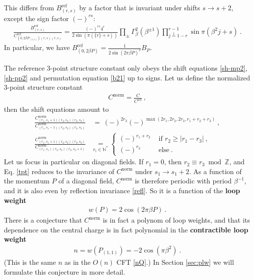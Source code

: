 \documentclass[12pt, a4paper]{article}
\newcommand{\myindex}[1]{\textbf{\boldmath #1}}
\theoremstyle{break}
\begin{document}
This differs from $B^\text{ref}_{(r,s)}$ by a factor that is invariant under shifts $s\to s+2$, except the sign factor $(-)^{rs}$:
 \begin{align}
  \frac{B^\text{ref}_{(r,s)}}{C^\text{ref}_{(0,2\beta P_{(1,1)})(r,s)(r,s)}} = 
  \frac{(-)^{rs} 4^r}{2\sin\left(\pi(\{r\}+s)\right)}
  \prod_\pm \Gamma_\beta^{2}(\beta^{\pm 1})
  \prod_{j\overset{1}{=}1-r}^{r-1} \sin\pi(\beta^2j+s) \ .
 \end{align}
In particular, we have $B^\text{ref}_{(0,2\beta P)} = \frac{1}{2\sin(2\pi\beta P)^2}B_P$.

The reference 3-point structure constant only obeys the shift equations \eqref{sh-mp2}, \eqref{sh-pp2} and permutation equation \eqref{b21} up to signs. Let us define the normalized 3-point structure constant 
\begin{align}
 C^\text{norm} = \frac{C}{C^\text{ref}}\ , 
\end{align}
then the shift equations amount to \cite{nrj23}
\begin{align}
 \frac{C^\text{norm}_{(r_1,s_1+1)(r_2,s_2)(r_3,s_3)}}{C^\text{norm}_{(r_1,s_1-1)(r_2,s_2)(r_3,s_3)}} &\ =\  (-)^{2r_3}(-)^{\max(2r_1, 2r_2, 2r_3,r_1+r_2+r_3)} \ ,
 \label{tpt}
 \\
 \frac{C^\text{norm}_{(r_1,s_1+1)(r_2,s_2)(r_3,s_3)}}{C^\text{norm}_{(r_1,s_1)(r_2,s_2)(r_3,s_3+1)}} &\underset{r_i\in\mathbb{N}^*}{=} 
 \left\{\begin{array}{ll} (-)^{r_1+r_2} &\text{ if } r_2\geq |r_1-r_3|\ ,
                        \\ (-)^{r_3} &\text{ else}\ .
                       \end{array}\right. 
\label{tppt}
\end{align}
Let us focus in particular on diagonal fields. If $r_1=0$, then $r_2\equiv r_3\bmod\mathbb{Z}$, and Eq. \eqref{tpt} reduces to the invariance of $C^\text{norm}$ under $s_1\to s_1+2$. As a function of the momentum $P$ of a diagonal field, $C^\text{norm}$ is therefore periodic with period $\beta^{-1}$, and it is also even by reflection invariance \eqref{refl}. So it is a function of the \myindex{loop weight}
\begin{align}
 \boxed{w(P) = 2\cos(2\pi\beta P)}\ .
 \label{wP}
\end{align}
There is a conjecture that $C^\text{norm}$ is in fact a polynom of loop weights, and that its dependence on the central charge is in fact polynomial in the \myindex{contractible loop weight}
\begin{align}
 \boxed{n= w\left(P_{(1,1)}\right) = -2\cos(\pi \beta^2)} \ .
 \label{ncb}
\end{align}
(This is the same $n$ as in the $O(n)$ CFT \eqref{nQ}.) In Section \ref{sec:plw} we will formulate this conjecture in more detail. 
\end{document}
